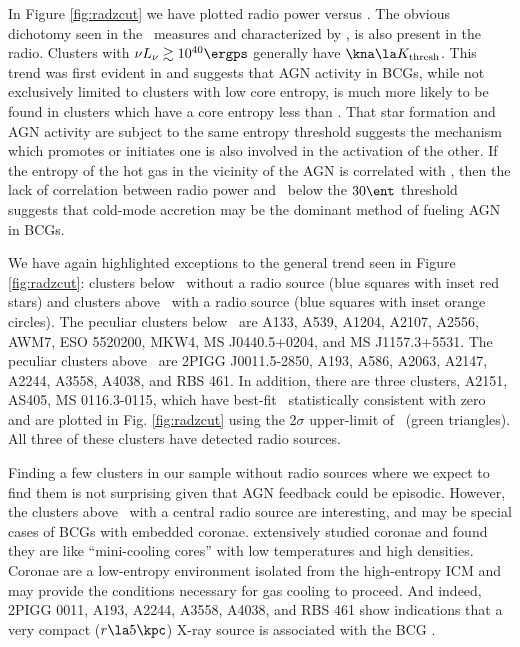 \documentclass{emulateapj}
\begin{document}
In Figure \ref{fig:radzcut} we have plotted radio power versus \kna.
The obvious dichotomy seen in the \halpha\ measures and characterized
by \kthr, is also present in the radio. Clusters with $\nu L_{\nu}
\gtrsim 10^{40} \ergps$ generally have $\kna \la \kthr$. This trend
was first evident in \citet{radioquiet} and suggests that AGN activity
in BCGs, while not exclusively limited to clusters with low core
entropy, is much more likely to be found in clusters which have a core
entropy less than \kthr. That star formation and AGN activity are
subject to the same entropy threshold suggests the mechanism which
promotes or initiates one is also involved in the activation of the
other. If the entropy of the hot gas in the vicinity of the AGN is
correlated with \kna, then the lack of correlation between radio power
and \kna\ below the $30 \ent$ threshold suggests that cold-mode
accretion \citep{pizzolato05, hardcastle07} may be the dominant method
of fueling AGN in BCGs.

We have again highlighted exceptions to the general trend seen in
Figure \ref{fig:radzcut}: clusters below \kthr\ without a radio source
(blue squares with inset red stars) and clusters above \kthr\ with a
radio source (blue squares with inset orange circles). The peculiar
clusters below \kthr\ are A133, A539, A1204, A2107, A2556, AWM7, ESO
5520200, MKW4, MS J0440.5+0204, and MS J1157.3+5531. The peculiar
clusters above \kthr\ are 2PIGG J0011.5-2850, A193, A586, A2063,
A2147, A2244, A3558, A4038, and RBS 461. In addition, there are three
clusters, A2151, AS405, MS 0116.3-0115, which have best-fit
\kna\ statistically consistent with zero and are plotted in
Fig. \ref{fig:radzcut} using the 2$\sigma$ upper-limit of \kna\ (green
triangles). All three of these clusters have detected radio sources.

Finding a few clusters in our sample without radio sources where
we expect to find them is not surprising given that AGN feedback could
be episodic. However, the clusters above \kthr\ with a central radio
source are interesting, and may be special cases of BCGs with embedded
coronae. \cite{coronae} extensively studied coronae and found they are
like ``mini-cooling cores'' with low temperatures and high
densities. Coronae are a low-entropy environment isolated from the
high-entropy ICM and may provide the conditions necessary for gas
cooling to proceed. And indeed, 2PIGG 0011, A193, A2244, A3558, A4038,
and RBS 461 show indications that a very compact ($r \la 5\kpc$) X-ray
source is associated with the BCG \citep{accept}.
\end{document}
